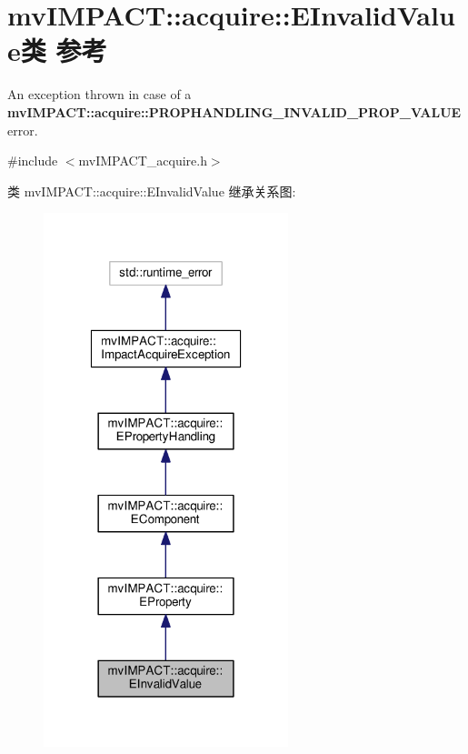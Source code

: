 \hypertarget{classmv_i_m_p_a_c_t_1_1acquire_1_1_e_invalid_value}{\section{mv\+I\+M\+P\+A\+C\+T\+:\+:acquire\+:\+:E\+Invalid\+Value类 参考}
\label{classmv_i_m_p_a_c_t_1_1acquire_1_1_e_invalid_value}
}


An exception thrown in case of a {\bfseries mv\+I\+M\+P\+A\+C\+T\+::acquire\+::\+P\+R\+O\+P\+H\+A\+N\+D\+L\+I\+N\+G\+\_\+\+I\+N\+V\+A\+L\+I\+D\+\_\+\+P\+R\+O\+P\+\_\+\+V\+A\+L\+U\+E} error.  




{\ttfamily \#include $<$mv\+I\+M\+P\+A\+C\+T\+\_\+acquire.\+h$>$}



类 mv\+I\+M\+P\+A\+C\+T\+:\+:acquire\+:\+:E\+Invalid\+Value 继承关系图\+:
\nopagebreak
\begin{figure}[H]
\begin{center}
\leavevmode
\includegraphics[width=202pt]{classmv_i_m_p_a_c_t_1_1acquire_1_1_e_invalid_value__inherit__graph}
\end{center}
\end{figure}


